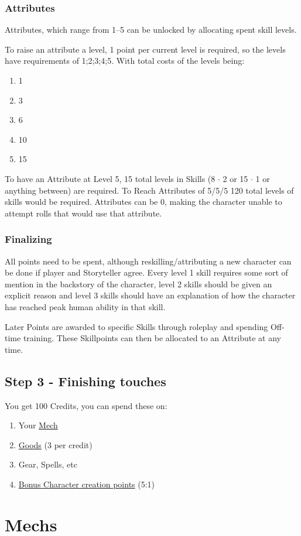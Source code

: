 \documentclass[a4paper]{book}
\begin{document}
    \subsection{Attributes}\label{subsec:attributes}
    Attributes, which range from 1--5 can be unlocked by allocating spent skill levels.\par
    To raise an attribute a level, 1 point per current level is required, so the levels have requirements of 1;2;3;4;5.
    With total costs of the levels being:\par
    \begin{enumerate}
        \item 1
        \item 3
        \item 6
        \item 10
        \item 15
    \end{enumerate}
    To have an Attribute at Level 5, 15 total levels in Skills (8 $\cdot$ 2 or 15 $\cdot$ 1 or anything between) are
    required.
    To Reach Attributes of 5/5/5 120 total levels of skills would be required.
    Attributes can be 0, making the character unable to attempt rolls that would use that attribute.

    \subsection{Finalizing}\label{subsec:finalizing}
    All points need to be spent, although reskilling/attributing a new character can be done if player and Storyteller
    agree.
    Every level 1 skill requires some sort of mention in the backstory of the character, level 2 skills should be given
    an explicit reason and level 3 skills should have an explanation of how the character has reached peak human ability
    in that skill.

    Later Points are awarded to specific Skills through roleplay and spending Off-time training.
    These Skillpoints can then be allocated to an Attribute at any time.

    \section{Step 3 - Finishing touches}\label{sec:step3-finishingtouches}
    You get 100 Credits, you can spend these on:
    \begin{enumerate}[label = -]
        \item Your \hyperref[ch:mechs]{Mech}
        \item \hyperref[sec:tradegoods]{Goods} (3 per credit)
        \item Gear, Spells, etc
        \item \hyperref[sec:step2-scores]{Bonus Character creation points} (5:1)
    \end{enumerate}

    \chapter{Mechs}\label{ch:mechs}
    
\end{document}
